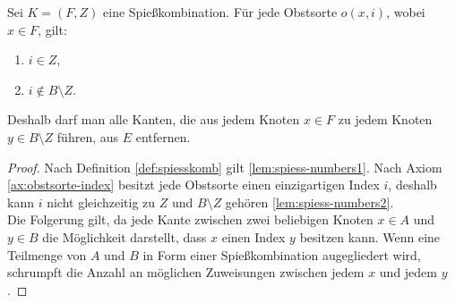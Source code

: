 \begin{lemma} \label{lem:spiess-numbers}
Sei $K = (F, Z)$ eine Spießkombination. Für jede Obstsorte $o(x, i)$, wobei $x \in F$, gilt:
\begin{enumerate}[label={\upshape(\roman*)}]
  \item $i \in Z$, \label{lem:spiess-numbers1}
  \item $i \notin B \setminus Z$. \label{lem:spiess-numbers2}
\end{enumerate}   
Deshalb darf man alle Kanten, die aus jedem Knoten $x \in F$ 
zu jedem Knoten $y \in B \setminus Z$ führen, aus $E$ entfernen.
\end{lemma}

\begin{proof}
Nach Definition \ref{def:spiesskomb} gilt \ref{lem:spiess-numbers1}. 
Nach Axiom \ref{ax:obstsorte-index} besitzt jede Obstsorte einen einzigartigen Index $i$,
deshalb kann $i$ nicht gleichzeitig zu $Z$ und $B \setminus Z$ gehören \ref{lem:spiess-numbers2}.\\
Die Folgerung gilt, da %
jede Kante zwischen zwei beliebigen Knoten $x \in A$ und $y \in B$ die Möglichkeit darstellt,
dass $x$ einen Index $y$ besitzen kann.
Wenn eine Teilmenge von $A$ und $B$ in Form einer Spießkombination augegliedert wird,
schrumpft die Anzahl an möglichen Zuweisungen zwischen jedem $x$ und jedem $y$. 
\end{proof}